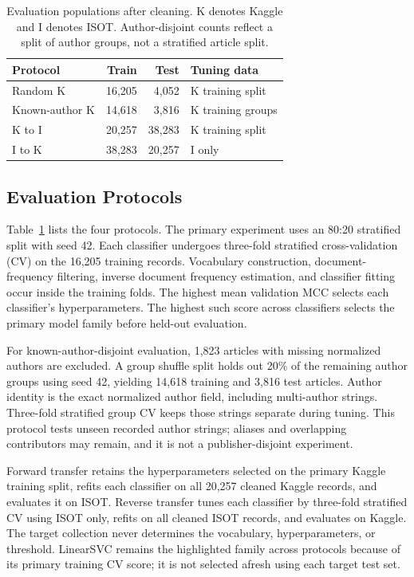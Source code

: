 \documentclass[conference]{IEEEtran}
\begin{document}
\begin{table}[t]
\caption{Evaluation populations after cleaning. K denotes Kaggle and I denotes ISOT. Author-disjoint counts reflect a split of author groups, not a stratified article split.}
\label{tab:splits}\centering\small
\begin{tabular}{lrrl}\toprule
Protocol & Train & Test & Tuning data\\\midrule
Random K & 16,205 & 4,052 & K training split\\
Known-author K & 14,618 & 3,816 & K training groups\\
K to I & 20,257 & 38,283 & K training split\\
I to K & 38,283 & 20,257 & I only\\\bottomrule
\end{tabular}
\end{table}

\subsection{Evaluation Protocols}
Table~\ref{tab:splits} lists the four protocols. The primary experiment uses an 80:20 stratified split with seed 42. Each classifier undergoes three-fold stratified cross-validation (CV) on the 16,205 training records. Vocabulary construction, document-frequency filtering, inverse document frequency estimation, and classifier fitting occur inside the training folds. The highest mean validation MCC selects each classifier's hyperparameters. The highest such score across classifiers selects the primary model family before held-out evaluation.

For known-author-disjoint evaluation, 1,823 articles with missing normalized authors are excluded. A group shuffle split holds out 20\% of the remaining author groups using seed 42, yielding 14,618 training and 3,816 test articles. Author identity is the exact normalized author field, including multi-author strings. Three-fold stratified group CV keeps those strings separate during tuning. This protocol tests unseen recorded author strings; aliases and overlapping contributors may remain, and it is not a publisher-disjoint experiment.

Forward transfer retains the hyperparameters selected on the primary Kaggle training split, refits each classifier on all 20,257 cleaned Kaggle records, and evaluates it on ISOT. Reverse transfer tunes each classifier by three-fold stratified CV using ISOT only, refits on all cleaned ISOT records, and evaluates on Kaggle. The target collection never determines the vocabulary, hyperparameters, or threshold. LinearSVC remains the highlighted family across protocols because of its primary training CV score; it is not selected afresh using each target test set.
\end{document}
